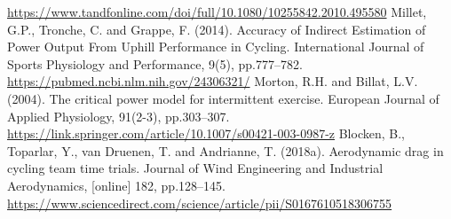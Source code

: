 \documentclass{mcmthesis}
\begin{document}
\begin{thebibliography}{99}
	\url{https://www.tandfonline.com/doi/full/10.1080/10255842.2010.495580}
	Millet, G.P., Tronche, C. and Grappe, F. (2014). Accuracy of Indirect Estimation of Power Output From Uphill Performance in Cycling. International Journal of Sports Physiology and Performance, 9(5), pp.777–782.
	\url{https://pubmed.ncbi.nlm.nih.gov/24306321/}
	Morton, R.H. and Billat, L.V. (2004). The critical power model for intermittent exercise. European Journal of Applied Physiology, 91(2-3), pp.303–307.
	\url{https://link.springer.com/article/10.1007/s00421-003-0987-z}
	Blocken, B., Toparlar, Y., van Druenen, T. and Andrianne, T. (2018a). Aerodynamic drag in cycling team time trials. Journal of Wind Engineering and Industrial Aerodynamics, [online] 182, pp.128–145.
	\url{https://www.sciencedirect.com/science/article/pii/S0167610518306755}
	
\end{thebibliography}













\end{document}
